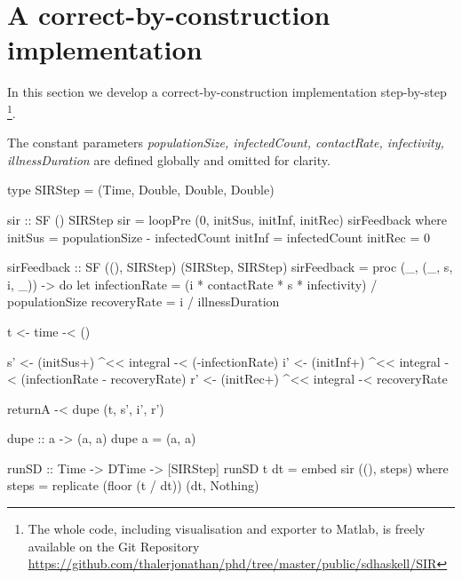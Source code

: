 \section{A correct-by-construction implementation}

In this section we develop a correct-by-construction implementation step-by-step \footnote{The whole code, including visualisation and exporter to Matlab, is freely available on the Git Repository \url{https://github.com/thalerjonathan/phd/tree/master/public/sdhaskell/SIR}}.

The constant parameters \textit{populationSize, infectedCount, contactRate, infectivity, illnessDuration} are defined globally and omitted for clarity.

%
%
%
%

\begin{HaskellCode}
type SIRStep = (Time, Double, Double, Double)

sir :: SF () SIRStep
sir = loopPre (0, initSus, initInf, initRec) sirFeedback
  where
    initSus = populationSize - infectedCount
    initInf = infectedCount
    initRec = 0

    sirFeedback :: SF ((), SIRStep) (SIRStep, SIRStep)
    sirFeedback = proc (_, (_, s, i, _)) -> do
      let infectionRate = (i * contactRate * s * infectivity) / populationSize
          recoveryRate  = i / illnessDuration

      t <- time -< ()

      s' <- (initSus+) ^<< integral -< (-infectionRate)
      i' <- (initInf+) ^<< integral -< (infectionRate - recoveryRate)
      r' <- (initRec+) ^<< integral -< recoveryRate

      returnA -< dupe (t, s', i', r')

    dupe :: a -> (a, a)
    dupe a = (a, a)
  
runSD :: Time -> DTime -> [SIRStep]
runSD t dt = embed sir ((), steps)
  where
    steps = replicate (floor (t / dt)) (dt, Nothing)
\end{HaskellCode}
